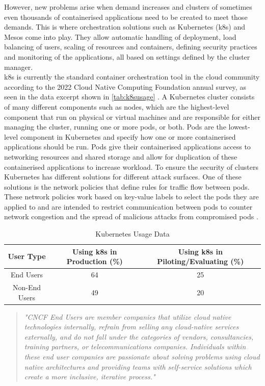  However, new problems arise when demand increases and clusters of sometimes even thousands of containerised applications need to be created to meet those demands. This is where orchestration solutions such as Kubernetes (\acrshort{k8s}) \cite{Bernstein2014} and Mesos \cite{Mesos} come into play. They allow automatic handling of deployment, load balancing of users, scaling of resources and containers, defining security practices and monitoring of the applications, all based on settings defined by the cluster manager.
\\[10pt]

\acrshort{k8s} is currently the standard container orchestration tool in the cloud community according to the 2022 Cloud Native Computing Foundation annual survey, as seen in the data excerpt shown in \autoref{tab:k8susage} \cite{CNCFSurvey}. A Kubernetes cluster consists of many different components such as nodes, which are the highest-level component that run on physical or virtual machines and are responsible for either managing the cluster, running one or more pods, or both. Pods are the lowest-level component in Kubernetes and specify how one or more containerised applications should be run. Pods give their containerised applications access to networking resources and shared storage and allow for duplication of these containerised applications to increase workload. To ensure the security of clusters Kubernetes has different solutions for different attack surfaces. One of these solutions is the network policies that define rules for traffic flow between pods. These network policies work based on key-value labels to select the pods they are applied to and are intended to restrict communication between pods to counter network congestion and the spread of malicious attacks from compromised pods \cite{nps}.
\\[10pt]
\begin{table}[h]
    \centering
    \begin{tabular}{|c|c|c|}
        \hline
        \textbf{User Type} & \textbf{Using \acrshort{k8s} in Production (\%)} & \textbf{Using \acrshort{k8s} in Piloting/Evaluating (\%)} \\
        \hline
        End Users & 64 & 25 \\
        Non-End Users & 49 & 20 \\
        \hline
    \end{tabular}
    \caption{Kubernetes Usage Data \cite{CNCFSurvey}}
    \label{tab:k8susage}
\end{table}
\begin{quote}
\textit{"CNCF End Users are member companies that utilize cloud native technologies internally, refrain from selling any cloud-native services externally, and do not fall under the categories of vendors, consultancies, training partners, or telecommunications companies. Individuals within these end user companies are passionate about solving problems using cloud native architectures and providing teams with self-service solutions which create a more inclusive, iterative process." \cite{CNCFSurvey}}
\end{quote}

